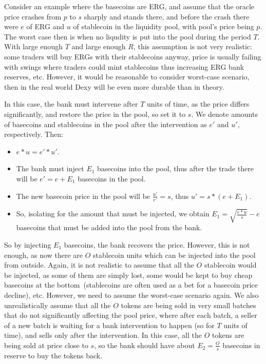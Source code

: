 \documentclass[a4paper,UKenglish,cleveref, autoref, thm-restate]{lipics-v2021}
\newcommand{\bc}{ERG}
\newcommand{\sct}{stablecoin}
\newcommand{\dx}{Dexy}
\begin{document}
Consider an example where the basecoins are \bc{}, and assume that the oracle price crashes from $p$ to $s$ sharply and stands there, and before the crash there were $e$ of \bc{} and $u$ of \sct{} in the liquidity pool, with pool's price being $p$. The worst case then is when no liqudity is put into the pool during the period $T$. With large enough $T$ and large enough $R$, this assumption is not very realistic: some traders will buy \bc{}s with their \sct{}s anyway, price is usually failing with swings where traders could mint \sct{}s thus increasing \bc{} bank reserves, etc. However, it would be reasonable to consider worst-case scenario, then in the real world \dx{} will be even more durable than in theory. 

In this case, the bank must intervene after $T$ units of time, as the price differs significantly, and restore the price in the pool, so set it to $s$. We denote amounts of basecoins and \sct{}s in the pool after the intervention as $e'$ and $u'$, respectively. Then:

\begin{itemize}
  \item{} $e * u = e' * u'$.
  \item{} The bank must inject $E_1$ basecoins into the pool, thus after the trade there will be $e' = e + E_1$ basecoins in the pool.
  \item{} The new basecoin price in the pool will be $\frac{u'}{e'} = s$, thus $u' = s * (e + E_1)$.
  \item{} So, isolating for the amount that must be injected, we obtain $E_1 = \sqrt{\frac{e * u}{s}} - e$ basecoins that must be added into the pool from the bank.
\end{itemize}

So by injecting $E_1$ basecoins, the bank recovers the price. However, this is not enough, as now there are $O$ \sct{} units which can be injected into the pool from outside. 
Again, it is not realistic to assume that all the $O$ \sct{} would be injected, as some of them are simply lost, some would be kept to buy cheap basecoins at the bottom~(\sct{}s are often used as a bet for a basecoin price decline), etc. However, we need to assume the worst-case scenario again. We also unrealistically assume that all the $O$ tokens are being sold in very small batches that do not significantly affecting the pool price, where after each batch, a seller of a new batch is waiting for a bank intervention to happen (so for $T$ units of time), and sells only after the intervention. In this case, all the $O$ tokens are being sold at price close to $s$, so the bank should have about $E_2 = \frac{O}{s}$ basecoins in reserve to buy the tokens back.
\end{document}
